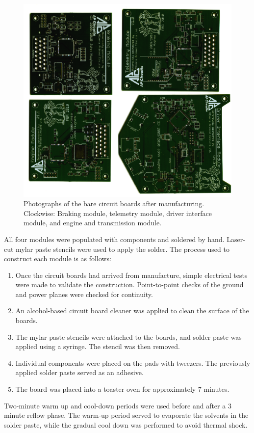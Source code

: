 \begin{figure}[H]
 \centering
 \includegraphics[width=5in,keepaspectratio]{implementation/figures/empty_pcbs.eps}
 \caption[Photographs of the bare circuit boards after manufacturing.]{Photographs of the bare circuit boards after manufacturing. Clockwise: Braking module, telemetry module, driver interface module, and engine and transmission module.}
 \label{fig:empty_pcbs}
\end{figure}

All four modules were populated with components and soldered by hand. Laser-cut mylar paste stencils were used to apply the solder. The process used to construct each module is as follows:

\begin{enumerate}
  \item Once the circuit boards had arrived from manufacture, simple electrical tests were made to validate the construction. Point-to-point checks of the ground and power planes were checked for continuity.
  \item An alcohol-based circuit board cleaner was applied to clean the surface of the boards.
  \item The mylar paste stencils were attached to the boards, and solder paste was applied using a syringe. The stencil was then removed.
  \item Individual components were placed on the pads with tweezers. The previously applied solder paste served as an adhesive.
  \item The board was placed into a toaster oven for approximately 7 minutes. 
\end{enumerate}

Two-minute warm up and cool-down periods were used before and after a 3 minute reflow phase. The warm-up period served to evaporate the solvents in the solder paste, while the gradual cool down was performed to avoid thermal shock.
